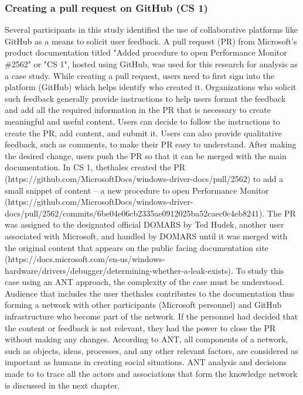 \subsubsection{Creating a pull request on GitHub (CS 1)}
Several participants in this study identified the use of collaborative platforms like GitHub as a means to solicit user feedback. A pull request (PR) from Microsoft's product documentation titled "Added procedure to open Performance Monitor \#2562" or "CS 1", hosted using GitHub, was used for this research for analysis as a case study. While creating a pull request, users need to first sign into the platform (GitHub) which helps identify who created it. Organizations who solicit such feedback generally provide instructions to help users format the feedback and add all the required information in the PR that is necessary to create meaningful and useful content. Users can decide to follow the instructions to create the PR, add content, and submit it. Users can also provide qualitative feedback, such as comments, to make their PR easy to understand. After making the desired change, users push the PR so that it can be merged with the main documentation. In CS 1, thethales created the PR (https://github.com/MicrosoftDocs/windows-driver-docs/pull/2562) to add a small snippet of content – a new procedure to open Performance Monitor (https://github.com/MicrosoftDocs/windows-driver-docs/pull/2562/commits/6be04e06cb2335ae0912025ba52caec0c4eb8241). The PR was assigned to the designated official DOMARS by Ted Hudek, another user associated with Microsoft, and handled by DOMARS until it was merged with the original content that appears on the public facing documentation site (https://docs.microsoft.com/en-us/windows-hardware/drivers/debugger/determining-whether-a-leak-exists). To study this case using an ANT approach, the complexity of the case must be understood. Audience that includes the user thethales contributes to the documentation thus forming a network with other participants (Microsoft personnel) and GitHub infrastructure who become part of the network. If the personnel had decided that the content or feedback is not relevant, they had the power to close the PR without making any changes. According to ANT, all components of a network, such as objects, ideas, processes, and any other relevant factors, are considered as important as humans in creating social situations. ANT analysis and decisions made to to trace all the actors and associations that form the knowledge network is discussed in the next chapter.

